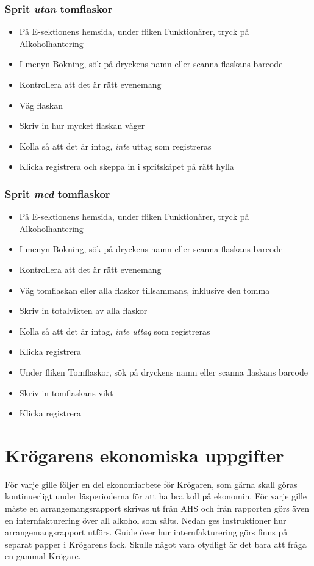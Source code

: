 \documentclass[10pt]{article}
\begin{document}
\subsubsection*{Sprit \textit{utan} tomflaskor}
\begin{itemize}
	\item På E-sektionens hemsida, under fliken Funktionärer, tryck på Alkoholhantering
    \item I menyn Bokning, sök på dryckens namn eller scanna flaskans barcode
    \item Kontrollera att det är rätt evenemang
    \item Väg flaskan
    \item Skriv in hur mycket flaskan väger
    \item Kolla så att det är intag, \textit{inte} uttag som registreras
    \item Klicka registrera och skeppa in i spritskåpet på rätt hylla

\end{itemize}

\subsubsection*{Sprit \textit{med} tomflaskor}
\begin{itemize}
	\item På E-sektionens hemsida, under fliken Funktionärer, tryck på Alkoholhantering
    \item I menyn Bokning, sök på dryckens namn eller scanna flaskans barcode
    \item Kontrollera att det är rätt evenemang
    \item Väg tomflaskan eller alla flaskor tillsammans, inklusive den tomma
    \item Skriv in totalvikten av alla flaskor
    \item Kolla så att det är intag, \textit{inte uttag} som registreras
    \item Klicka registrera
    \item Under fliken Tomflaskor, sök på dryckens namn eller scanna flaskans barcode
    \item Skriv in tomflaskans vikt
    \item Klicka registrera

\end{itemize}

\section{Krögarens ekonomiska uppgifter}
För varje gille följer en del ekonomiarbete för Krögaren, som gärna skall göras
kontinuerligt under läsperioderna för att ha bra koll på ekonomin. För varje gille måste en arrangemangsrapport skrivas ut från AHS och från rapporten görs även en internfakturering över all alkohol som sålts. Nedan ges instruktioner hur arrangemangsrapport utförs. Guide över hur internfakturering görs finns på separat papper i Krögarens fack. Skulle något vara otydligt är det bara att fråga en gammal Krögare.
\end{document}
